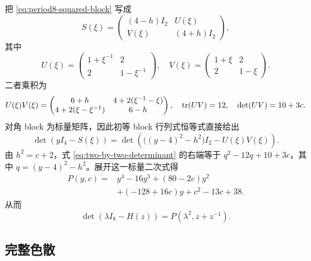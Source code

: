 把 \eqref{eq:period8-squared-block} 写成
\[
 S(\xi)=\begin{pmatrix}(4-h)I_2&U(\xi)\\V(\xi)&(4+h)I_2\end{pmatrix},
\]
其中
\[
 U(\xi)=\begin{pmatrix}1+\xi^{-1}&2\\2&1-\xi^{-1}\end{pmatrix},
 \quad
 V(\xi)=\begin{pmatrix}1+\xi&2\\2&1-\xi\end{pmatrix}.
\]
二者乘积为
\begin{equation}
 U(\xi)V(\xi)=
 \begin{pmatrix}
 6+h&4+2(\xi^{-1}-\xi)\\
 4+2(\xi-\xi^{-1})&6-h
 \end{pmatrix},
 \quad \operatorname{tr}(UV)=12,\quad \det(UV)=10+3c.
 \label{eq:uv-invariants}
\end{equation}
对角 block 为标量矩阵，因此初等 block 行列式恒等式直接给出
\begin{equation}
 \det(yI_4-S(\xi))
 =\det\!\left(\bigl((y-4)^2-h^2\bigr)I_2-U(\xi)V(\xi)\right).
 \label{eq:two-by-two-determinant}
\end{equation}
由 $h^2=c+2$，式 \eqref{eq:two-by-two-determinant} 的右端等于
$q^2-12q+10+3c$，其中 $q=(y-4)^2-h^2$。展开这一标量二次式得
\begin{equation}
\begin{split}
 P(y,c)={}&y^4-16y^3+(80-2c)y^2\\
          &+(-128+16c)y+c^2-13c+38.
\end{split}
\label{eq:period8-polynomial}
\end{equation}
从而
\begin{equation}
 \det(\lambda I_8-H(z))=P(\lambda^2,z+z^{-1}).
 \label{eq:period8-characteristic}
\end{equation}

\subsection{完整色散}

